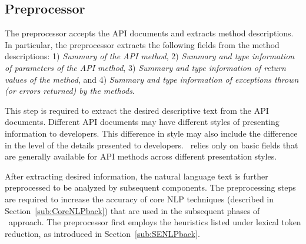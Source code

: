 \subsection{Preprocessor}
\label{sub:prep}

The preprocessor accepts the API documents and extracts method descriptions.
In particular, the preprocessor extracts the following fields from the method descriptions: 
1) \textit{Summary of the API method},
2) \textit{Summary and type information of parameters of the API method}, 
3) \textit{Summary and type information of return values of the method}, and
4) \textit{Summary and type information of exceptions thrown (or errors returned) by the methods}.

This step is required to extract the desired descriptive text from the API documents.
Different API documents may have different styles of presenting information to developers.
This difference in style may also include the difference in the level of the details presented to developers.
\tool\ relies only on basic fields that are generally available for API methods across different presentation styles. 

After extracting desired information, the natural language text is further preprocessed to be analyzed by subsequent components.
The preprocessing steps are required to increase the accuracy of core NLP techniques (described in Section~\ref{sub:CoreNLPback}) that are used in the subsequent phases of \tool\ approach.
The preprocessor first employs the heuristics listed under lexical token reduction, as introduced in Section~\ref{sub:SENLPback}.

